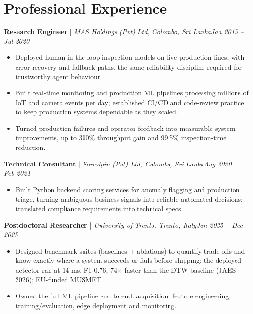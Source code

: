 \documentclass[11pt]{article}
\newenvironment{cvrole}[5]{%
  \par\noindent\textbf{\large #1} | \textit{\small #2, #3}\hfill \textit{\small #4 -- #5}\par
  \begin{itemize}[leftmargin=2em, itemsep=-0.3em, topsep=-0.5em]%
}{%
  \end{itemize}\par\noindent\mbox{}\par\vspace{0.1em}%
}
\begin{document}
\section*{Professional Experience}

\begin{cvrole}{Research Engineer}{MAS Holdings (Pvt) Ltd}{Colombo, Sri Lanka}{Jan 2015}{Jul 2020}
    \item Deployed human-in-the-loop inspection models on live production lines, with error-recovery and fallback paths, the same reliability discipline required for trustworthy agent behaviour.
    \item Built real-time monitoring and production ML pipelines processing millions of IoT and camera events per day; established CI/CD and code-review practice to keep production systems dependable as they scaled.
    \item Turned production failures and operator feedback into measurable system improvements, up to 300\% throughput gain and 99.5\% inspection-time reduction.
\end{cvrole}

\begin{cvrole}{Technical Consultant}{Forestpin (Pvt) Ltd}{Colombo, Sri Lanka}{Aug 2020}{Feb 2021}
    \item Built Python backend scoring services for anomaly flagging and production triage, turning ambiguous business signals into reliable automated decisions; translated compliance requirements into technical specs.
\end{cvrole}

\begin{cvrole}{Postdoctoral Researcher}{University of Trento}{Trento, Italy}{Jan 2025}{Dec 2025}
    \item Designed benchmark suites (baselines + ablations) to quantify trade-offs and know exactly where a system succeeds or fails before shipping; the deployed detector ran at 14 ms, F1 0.76, 74$\times$ faster than the DTW baseline (JAES 2026); EU-funded MUSMET.
    \item Owned the full ML pipeline end to end: acquisition, feature engineering, training/evaluation, edge deployment and monitoring.
\end{cvrole}
\end{document}
